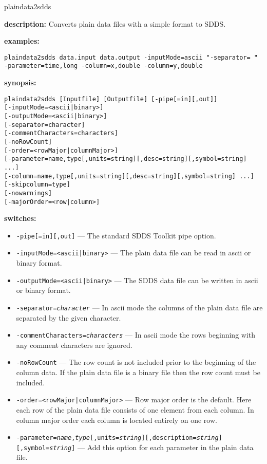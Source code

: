 \begin{sddsprog}{plaindata2sdds}
  \item \textbf{description:} Converts plain data files with a simple format to SDDS.
  \item \textbf{examples:}
    \begin{verbatim}
plaindata2sdds data.input data.output -inputMode=ascii "-separator= " -parameter=time,long -column=x,double -column=y,double
    \end{verbatim}
  \item \textbf{synopsis:}
    \begin{verbatim}
plaindata2sdds [Inputfile] [Outputfile] [-pipe[=in][,out]]
[-inputMode=<ascii|binary>]
[-outputMode=<ascii|binary>]
[-separator=character]
[-commentCharacters=characters]
[-noRowCount]
[-order=<rowMajor|columnMajor>]
[-parameter=name,type[,units=string][,desc=string][,symbol=string] ...]
[-column=name,type[,units=string][,desc=string][,symbol=string] ...]
[-skipcolumn=type]
[-nowarnings]
[-majorOrder=<row|column>]
    \end{verbatim}
  \item \textbf{switches:}
    \begin{itemize}
      \item {\tt -pipe[=in][,out]} --- The standard SDDS Toolkit pipe option.
      \item {\tt -inputMode=<ascii|binary>} --- The plain data file can be read in ascii or binary format.
      \item {\tt -outputMode=<ascii|binary>} --- The SDDS data file can be written in ascii or binary format.
      \item {\tt -separator={\em character}} --- In ascii mode the columns of the plain data file are separated by the given character.
      \item {\tt -commentCharacters={\em characters}} --- In ascii mode the rows beginning with any comment characters are ignored.
      \item {\tt -noRowCount} --- The row count is not included prior to the beginning of the column data. If the plain data file is a binary file then the row count must be included.
      \item {\tt -order=<rowMajor|columnMajor>} --- Row major order is the default. Here each row of the plain data file consists of one element from each column. In column major order each column is located entirely on one row.
      \item {\tt -parameter={\em name},{\em type}[,units={\em string}][,description={\em string}][,symbol={\em string}]} --- Add this option for each parameter in the plain data file.

\end{itemize}
\end{sddsprog}
